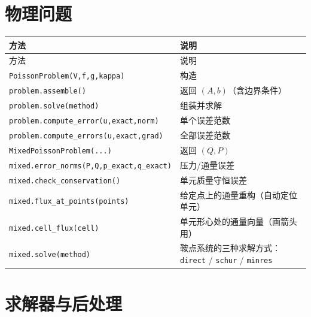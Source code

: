 \documentclass[UTF8,11pt,oneside]{ctexbook}
\theoremstyle{definition}
\theoremstyle{plain}
\newcommand{\code}[1]{\texttt{#1}}
\begin{document}
\section{物理问题}

\begingroup\small
\begin{longtable}{@{}L{5.0cm}L{9.4cm}@{}}
\toprule
方法 & 说明 \\
\midrule
\endfirsthead
\toprule
方法 & 说明 \\
\midrule
\endhead
\code{PoissonProblem(V,\allowbreak  f,\allowbreak  g,\allowbreak  kappa)} & 构造 \\
\code{problem.assemble()} & 返回 $(A,b)$（含边界条件） \\
\code{problem.solve(method)} & 组装并求解 \\
\code{problem.compute\_\allowbreak error(u,\allowbreak  exact,\allowbreak  norm)} & 单个误差范数 \\
\code{problem.compute\_\allowbreak errors(u,\allowbreak  exact,\allowbreak  grad)} & 全部误差范数 \\
\code{MixedPoissonProblem(...)} & 返回 $(Q,P)$ \\
\code{mixed.error\_\allowbreak norms(P,\allowbreak  Q,\allowbreak  p\_\allowbreak exact,\allowbreak  q\_\allowbreak exact)} & 压力/通量误差 \\
\code{mixed.check\_\allowbreak conservation()} & 单元质量守恒误差 \\
\code{mixed.flux\_\allowbreak at\_\allowbreak points(points)} & 给定点上的通量重构（自动定位单元） \\
\code{mixed.cell\_\allowbreak flux(cell)} & 单元形心处的通量向量（画箭头用） \\
\code{mixed.solve(method)} & 鞍点系统的三种求解方式：\code{direct} / \code{schur} / \code{minres} \\
\bottomrule
\end{longtable}
\endgroup

\section{求解器与后处理}
\end{document}
